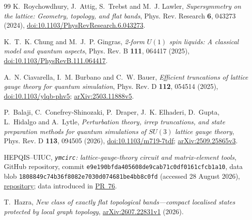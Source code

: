 \documentclass[11pt]{article}
\theoremstyle{plain}
\theoremstyle{definition}
\theoremstyle{remark}
\begin{document}
\begin{thebibliography}{99}
 K.~Roychowdhury, J.~Attig, S.~Trebst and
  M.~J. Lawler, \emph{Supersymmetry on the lattice: Geometry, topology, and
  flat bands}, Phys. Rev. Research \textbf{6}, 043273 (2024),
  \href{https://doi.org/10.1103/PhysRevResearch.6.043273}{doi:10.1103/PhysRevResearch.6.043273}.

 K.~T.~K. Chung and M.~J.~P. Gingras,
  \emph{2-form $U(1)$ spin liquids: A classical model and quantum aspects},
  Phys. Rev. B \textbf{111}, 064417 (2025),
  \href{https://doi.org/10.1103/PhysRevB.111.064417}{doi:10.1103/PhysRevB.111.064417}.

 A.~N. Ciavarella, I.~M. Burbano and C.~W. Bauer,
  \emph{Efficient truncations of lattice gauge theory for quantum simulation},
  Phys. Rev. D \textbf{112}, 054514 (2025),
  \href{https://doi.org/10.1103/ylqb-phv5}{doi:10.1103/ylqb-phv5};
  \href{https://arxiv.org/abs/2503.11888}{arXiv:2503.11888v5}.

 P.~Balaji, C.~Conefrey-Shinozaki, P.~Draper,
  J.~K. Elhaderi, D.~Gupta, L.~Hidalgo and A.~Lytle,
  \emph{Perturbation theory, irrep truncations, and state preparation methods
  for quantum simulations of $SU(3)$ lattice gauge theory}, Phys. Rev. D
  \textbf{113}, 094505 (2026),
  \href{https://doi.org/10.1103/m719-7tdf}{doi:10.1103/m719-7tdf};
  \href{https://arxiv.org/abs/2509.25865}{arXiv:2509.25865v3}.

 HEPQIS--UIUC,
  \emph{\texttt{ymcirc}: lattice-gauge-theory circuit and matrix-element
  tools}, GitHub repository, commit
  \nolinkurl{e9e190bfda405608de9cab71c0df0161cfcb1a10}, data blob
  \nolinkurl{1808849c74b36f8082e7030d074681be4bb8c0fd} (accessed 28 August
  2026), \href{https://github.com/hepqis-uiuc/ymcirc}{repository};
  data introduced in \href{https://github.com/hepqis-uiuc/ymcirc/pull/76}{PR~76}.

 T.~Hazra,
  \emph{New class of exactly flat topological bands---compact localised states
  protected by local graph topology},
  \href{https://arxiv.org/abs/2607.22831}{arXiv:2607.22831v1} (2026).

\end{thebibliography}
\end{document}
